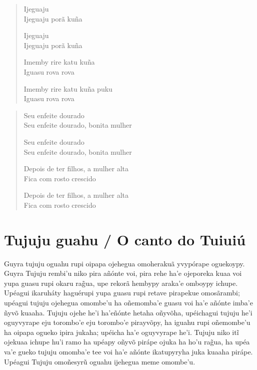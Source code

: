 \begin{itemize}
\begin{verse}
Ijeguaju\\
Ijeguaju porã kuña

Ijeguaju\\
Ijeguaju porã kuña

Imemby rire katu kuña\\
Iguasu rova rova

Imemby rire katu kuña puku\\
Iguasu rova rova
\end{verse}

\begin{verse}
Seu enfeite dourado\\
Seu enfeite dourado, bonita mulher

Seu enfeite dourado\\
Seu enfeite dourado, bonita mulher

Depois de ter filhos, a mulher alta\\
Fica com rosto crescido

Depois de ter filhos, a mulher alta\\
Fica com rosto crescido
\end{verse}

\chapter{Tujuju guahu / O canto do Tuiuiú}

Guyra tujuju oguahu rupi oipapa ojehegua omoherakuã yvypórape oguekoypy.
Guyra Tujuju rembi'u niko pira añónte voi, pira rehe ha'e ojeporeka kuaa
voi yupa guasu rupi okaru rag̃ua, upe rekorã hembypy araka'e omboypy
ichupe. Upéagui ikaruháty haguérupi yupa guasu rupi retave pirapekue
omosãrambi; upéagui tujuju ojehegua omombe'u ha oñemomba'e guasu voi
ha'e añónte imba'e ñyvõ kuaaha. Tujuju ojehe he'i ha'eñónte hetaha
oñyvõha, upéichagui tujuju he'i oguyvyrape eju torombo'e eju torombo'e
pirayvõpy, ha iguahu rupi oñemombe'u ha oipapa ogueko ipira jukaha;
upéicha ha'e oguyvyrape he'i. Tujuju niko itĩ ojekuaa ichupe hu'i ramo
ha upéapy oñyvõ pirápe ojuka ha ho'u rag̃ua, ha upéa va'e gueko tujuju
omomba'e tee voi ha'e añónte ikatupyryha juka kuaaha pirápe. Upéagui
Tujuju omoñesyrũ oguahu ijehegua meme omombe'u.


\end{itemize}
